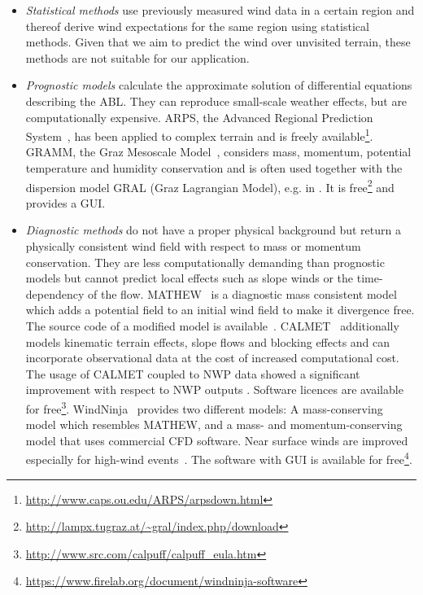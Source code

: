 \documentclass[twocolumn,letterpaper]{IEEEAerospaceCLS}
\begin{document}
\begin{itemize}
\item \emph{Statistical methods} use previously measured wind data in a certain region and thereof derive wind expectations for the same region using statistical methods. Given that we aim to predict the wind over unvisited terrain, these methods are not suitable for our application.
\item \emph{Prognostic models} calculate the approximate solution of differential equations describing the \ac{ABL}. They can reproduce small-scale weather effects, but are computationally expensive. ARPS, the Advanced Regional Prediction System~\cite{Xue2000,Xue2001}, has been applied to complex terrain \cite{Mott2010,Mott2010b,Hug2005,Raderschall2008} and is freely available\footnote{\url{http://www.caps.ou.edu/ARPS/arpsdown.html}}. GRAMM, the Graz Mesoscale Model~\cite{GRAMM}, considers mass, momentum, potential temperature and humidity conservation and is often used together with the dispersion model GRAL (Graz Lagrangian Model), e.g. in \cite{Oettl2015}. It is free\footnote{\url{http://lampx.tugraz.at/~gral/index.php/download}} and provides a GUI.
\item \emph{Diagnostic methods} do not have a proper physical background but return a physically consistent wind field with respect to mass or momentum conservation. They are less computationally demanding than prognostic models but cannot predict local effects such as slope winds \cite{Ratto1994} or the time-dependency of the flow. MATHEW~\cite{Sherman1978a,Sherman1978b} is a diagnostic mass consistent model which adds a potential field to an initial wind field to make it divergence free. The source code of a modified model is available~\cite{Walt2016}. CALMET~\cite{CALMET} additionally models kinematic terrain effects, slope flows and blocking effects and can incorporate observational data at the cost of increased computational cost. The usage of CALMET coupled to NWP data showed a significant improvement with respect to NWP outputs \cite{Truhetz2007,Morales2012}. Software licences are available for free\footnote{\url{http://www.src.com/calpuff/calpuff_eula.htm}}. WindNinja~\cite{Forthofer2014} provides two different models: A mass-conserving model which resembles MATHEW, and a mass- and momentum-conserving model that uses commercial \ac{CFD} software. Near surface winds are improved especially for high-wind events~\cite{Wagenbrenner2016}. The software with GUI is available for free\footnote{\url{https://www.firelab.org/document/windninja-software}}.
\end{itemize}
\end{document}
